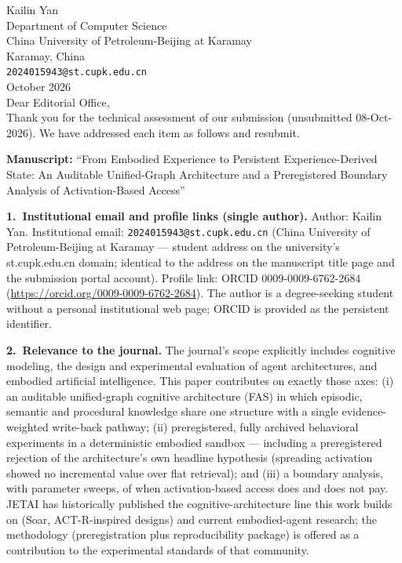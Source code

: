 \documentclass[10pt]{article}
\begin{document}
\noindent
Kailin Yan\\
Department of Computer Science\\
China University of Petroleum-Beijing at Karamay\\
Karamay, China\\
\texttt{2024015943@st.cupk.edu.cn}\\[10pt]
 October 2026\\[10pt]

\noindent Dear Editorial Office,\\[6pt]

\noindent Thank you for the technical assessment of our submission
(unsubmitted 08-Oct-2026). We have addressed each item as follows and
resubmit.

\medskip
\noindent\textbf{Manuscript:} ``From Embodied Experience to Persistent
Experience-Derived State: An Auditable Unified-Graph Architecture and a
Preregistered Boundary Analysis of Activation-Based Access''

\medskip
\noindent\textbf{1.\ Institutional email and profile links (single
author).} Author: Kailin Yan. Institutional email:
\texttt{2024015943@st.cupk.edu.cn} (China University of
Petroleum-Beijing at Karamay --- student address on the university's
st.cupk.edu.cn domain; identical to the address on the manuscript title
page and the submission portal account). Profile link: ORCID
0009-0009-6762-2684 (\url{https://orcid.org/0009-0009-6762-2684}). The
author is a degree-seeking student without a personal institutional web
page; ORCID is provided as the persistent identifier.

\medskip
\noindent\textbf{2.\ Relevance to the journal.} The journal's scope
explicitly includes cognitive modeling, the design and experimental
evaluation of agent architectures, and embodied artificial intelligence.
This paper contributes on exactly those axes: (i) an auditable
unified-graph cognitive architecture (FAS) in which episodic, semantic
and procedural knowledge share one structure with a single
evidence-weighted write-back pathway; (ii) preregistered, fully archived
behavioral experiments in a deterministic embodied sandbox --- including
a preregistered rejection of the architecture's own headline hypothesis
(spreading activation showed no incremental value over flat retrieval);
and (iii) a boundary analysis, with parameter sweeps, of when
activation-based access does and does not pay. JETAI has historically
published the cognitive-architecture line this work builds on (Soar,
ACT-R-inspired designs) and current embodied-agent research; the
methodology (preregistration plus reproducibility package) is offered as
a contribution to the experimental standards of that community.
\end{document}
